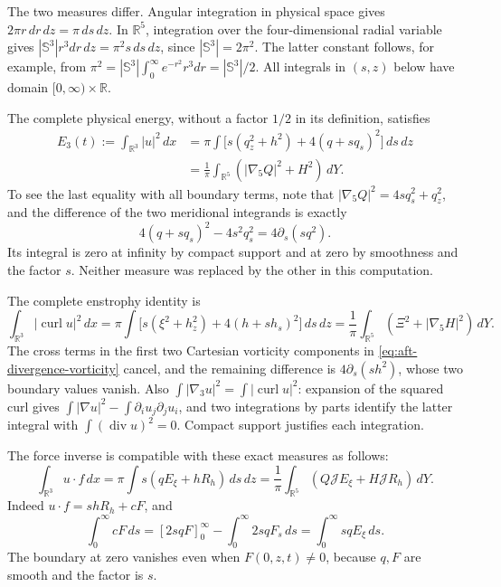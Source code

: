 The two measures differ.  Angular integration in physical space gives
\(2\pi r\,dr\,dz=\pi\,ds\,dz\).  In \(\mathbb R^5\), integration
over the four-dimensional radial variable gives
\(|\mathbb S^3|r^3dr\,dz=\pi^2s\,ds\,dz\), since
\(|\mathbb S^3|=2\pi^2\).  The latter constant follows, for example,
from \(\pi^2=|\mathbb S^3|\int_0^\infty e^{-r^2}r^3dr
=|\mathbb S^3|/2\).  All integrals in \((s,z)\) below have domain
\([0,\infty)\times\mathbb R\).

The complete physical energy, without a factor \(1/2\) in its definition,
satisfies
\begin{equation}\label{eq:aft-energy}
 \begin{split}
 E_3(t):=\int_{\mathbb R^3}|u|^2\,dx
 &=\pi\int\bigl[s(q_z^2+h^2)+4(q+s q_s)^2\bigr]\,ds\,dz\\
 &=\frac1\pi\int_{\mathbb R^5}(|\nabla_5Q|^2+H^2)\,dY.
 \end{split}
\end{equation}
To see the last equality with all boundary terms, note that
\(|\nabla_5Q|^2=4s q_s^2+q_z^2\), and the difference of the two
meridional integrands is exactly
\[
 4(q+s q_s)^2-4s^2q_s^2=4\partial_s(sq^2).
\]
Its integral is zero at infinity by compact support and at zero by
smoothness and the factor \(s\).  Neither measure was replaced by the
other in this computation.

The complete enstrophy identity is
\begin{equation}\label{eq:aft-enstrophy}
 \int_{\mathbb R^3}|\operatorname{curl}u|^2\,dx
 =\pi\int\bigl[s(\xi^2+h_z^2)+4(h+s h_s)^2\bigr]\,ds\,dz
 =\frac1\pi\int_{\mathbb R^5}(\Xi^2+|\nabla_5H|^2)\,dY.
\end{equation}
The cross terms in the first two Cartesian vorticity components in
\eqref{eq:aft-divergence-vorticity} cancel, and the remaining difference
is \(4\partial_s(sh^2)\), whose two boundary values vanish.  Also
\(\int|\nabla_3u|^2=\int|\operatorname{curl}u|^2\): expansion of the
squared curl gives \(\int|\nabla u|^2-\int\partial_i u_j\partial_j u_i\),
and two integrations by parts identify the latter integral with
\(\int(\operatorname{div}u)^2=0\).  Compact support justifies each
integration.

The force inverse is compatible with these exact measures as follows:
\begin{equation}\label{eq:aft-force-work}
 \int_{\mathbb R^3}u\cdot f\,dx
 =\pi\int s(qE_\xi+hR_h)\,ds\,dz
 =\frac1\pi\int_{\mathbb R^5}
                  (Q\mathcal J E_\xi+H\mathcal J R_h)\,dY.
\end{equation}
Indeed \(u\cdot f=s hR_h+cF\), and
\[
 \int_0^\infty cF\,ds
 =[2s qF]_0^\infty-\int_0^\infty2s qF_s\,ds
 =\int_0^\infty s qE_\xi\,ds.
\]
The boundary at zero vanishes even when \(F(0,z,t)\ne0\), because
\(q,F\) are smooth and the factor is \(s\).


